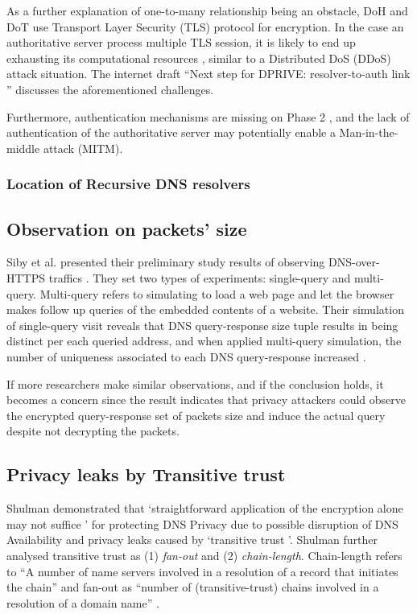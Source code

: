 As a further explanation of one-to-many relationship being an obstacle, DoH \cite{rfc8484} and DoT \cite{hu2016specification} use Transport Layer Security (TLS) protocol \cite{rfc7858} for encryption. In the case an authoritative server process multiple TLS session, it is likely to end up exhausting its computational resources \cite{bhople2012server}, similar to a Distributed DoS (DDoS) attack situation. The internet draft ``Next step for DPRIVE: resolver-to-auth link \cite{I-D.bortzmeyer-dprive-step-2}'' discusses the aforementioned challenges.

Furthermore, authentication mechanisms are missing on Phase 2 \cite{I-D.bortzmeyer-dprive-step-2}, and the lack of authentication of the authoritative server may potentially enable a Man-in-the-middle attack (MITM).

\subsubsection{Location of Recursive DNS resolvers}\label{rr-location}

\FloatBarrier

\subsection{Observation on packets' size}
Siby et al. presented their preliminary study results of observing DNS-over-HTTPS traffics \cite{siby2018dns}.
They set two types of experiments: single-query and multi-query. Multi-query refers to simulating to load a web page and let the browser makes follow up queries of the embedded contents of a website.
Their simulation of single-query visit reveals that DNS query-response size tuple results in being distinct per each queried address, and when applied multi-query simulation, the number of uniqueness associated to each DNS query-response increased \cite{siby2018dns}.

If more researchers make similar observations, and if the conclusion holds, it becomes a concern since the result indicates that privacy attackers could observe the encrypted query-response set of packets size and induce the actual query despite not decrypting the packets.

\subsection{Privacy leaks by Transitive trust}
Shulman demonstrated that `straightforward application of the encryption alone may not suffice \cite{Shulman:2014}' for protecting DNS Privacy due to possible disruption of DNS Availability and privacy leaks caused by `transitive trust \cite{Ramasubramanian:2005}'.
Shulman further analysed transitive trust as (1) \textit{fan-out} and (2) \textit{chain-length}.
Chain-length refers to ``A number of name servers involved in a resolution of a record that initiates the chain'' and fan-out as ``number of (transitive-trust) chains involved in a resolution of a domain name'' \cite{Shulman:2014}.

